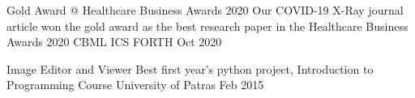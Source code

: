 

\begin{cvhonors}

  \cvhonor
    {Gold Award @ Healthcare Business Awards 2020} %
    {Our COVID-19 X-Ray journal article \cite{tsiknakisinterpretable} won the gold award as the best research paper in the Healthcare Business Awards 2020} %
    {CBML ICS FORTH} %
    {Oct 2020} %

  \cvhonor
    {Image Editor and Viewer} %
    {Best first year's python project, Introduction to Programming Course} %
    {University of Patras} %
    {Feb 2015} %

\end{cvhonors}